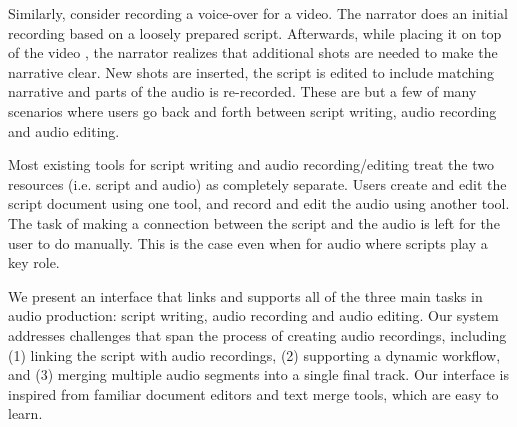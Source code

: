 Similarly, consider recording a voice-over for a video. The narrator does an initial recording based on a loosely prepared script. Afterwards, while placing it on top of the video , the narrator realizes that additional shots are needed to make the narrative clear. New shots are inserted, the script is edited to include matching narrative and parts of the audio is re-recorded.
These are but a few of many scenarios where
users go back and forth between script writing, audio
recording and audio editing.



Most existing tools for script writing and audio recording/editing treat the two resources (i.e. script and audio) as completely separate. Users create and edit the script document using one tool, and record and edit the audio using another tool.
The task of making a connection between the script and the audio is left for the user to do manually. This is the case even
when for audio where scripts play a key role.
  

We present an interface that links and supports all of the three main tasks in audio production: script writing, audio recording and audio editing. Our system addresses challenges that span the process of creating audio recordings, including (1) linking the script  with audio recordings, (2) supporting a dynamic workflow, and (3) merging multiple audio segments into a single final track. Our interface is inspired from familiar document editors and text merge tools, which are easy to learn.
\fi
